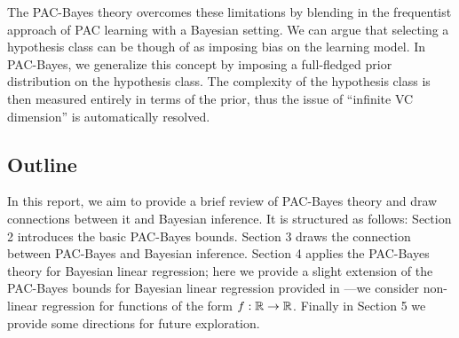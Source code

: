 The PAC-Bayes theory overcomes these limitations by blending in the frequentist
approach of PAC learning with a Bayesian setting. We can argue that selecting a
hypothesis class can be though of as imposing bias on the learning model. In
PAC-Bayes, we generalize this concept by imposing a full-fledged prior
distribution on the hypothesis class. The complexity of the hypothesis class is
then measured entirely in terms of the prior, thus the issue of ``infinite VC
dimension'' is automatically resolved.

\subsection{Outline}

In this report, we aim to provide a brief review of PAC-Bayes theory and draw
connections between it and Bayesian inference. It is structured as follows:
Section 2 introduces the basic PAC-Bayes bounds. Section 3 draws the connection
between PAC-Bayes and Bayesian inference. Section 4 applies the PAC-Bayes theory
for Bayesian linear regression; here we provide a slight extension of the
PAC-Bayes bounds for Bayesian linear regression provided in
\citep{germain2016pac}---we consider non-linear regression for functions of the
form $f : \mathbb{R} \to \mathbb{R}$. Finally in Section 5 we provide some directions for
future exploration.
